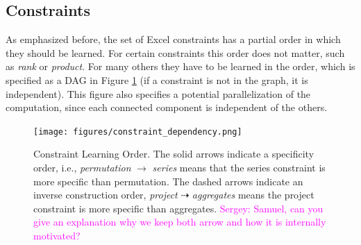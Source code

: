 \documentclass{ecai}
\newcommand{\sergey}[1]{\textcolor{magenta}{{\sc Sergey:} #1}\xspace}
\newcommand{\format}[1]{\textit{#1}\xspace}
\begin{document}
\subsection{Constraints}
As emphasized before, the set of Excel constraints has a partial order in which they should be learned. For certain constraints this order does not matter, such as \textit{rank} or \textit{product}. For many others they have to be learned in the order, which is specified as a DAG in Figure \ref{fig:learning_order} (if a constraint is not in the graph, it is independent). This figure also specifies a potential parallelization of the computation, since each connected component is independent of the others.


\begin{figure}[htb]
  \centering
  \texttt{[image: figures/constraint\_dependency.png]}
  \caption{Constraint Learning Order. The solid arrows indicate a specificity order, i.e., \textit{permutation} $\rightarrow$ \textit{series} means that the series constraint is more specific than permutation. The dashed arrows indicate an inverse construction order, \textit{project} $\dashrightarrow$ \textit{aggregates} means the project constraint is more specific than aggregates. \sergey{Samuel,  can you give an explanation why we keep both arrow and how it is internally motivated?}}
  \label{fig:learning_order}
\end{figure}


\newcommand{\numeric}{\format{numeric}}
\newcommand{\textual}{\format{textual}}
\newcommand{\integer}{\format{integer}}
\newcommand{\length}{\format{length}}
\newcommand{\nat}{\mathcal{N}}
\end{document}
